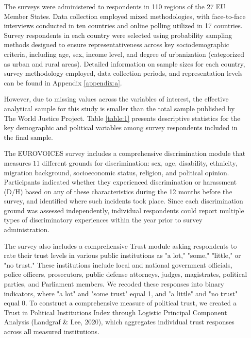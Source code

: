\documentclass{article}
\begin{document}
The surveys were administered to respondents in 110 regions of the 27 EU Member States. Data collection employed mixed methodologies, with face-to-face interviews conducted in ten countries and online polling utilized in 17 countries. Survey respondents in each country were selected using probability sampling methods designed to ensure representativeness across key sociodemographic criteria, including age, sex, income level, and degree of urbanization (categorized as urban and rural areas). Detailed information on sample sizes for each country, survey methodology employed, data collection periods, and representation levels can be found in Appendix \ref{appendix:a}.

However, due to missing values across the variables of interest, the effective analytical sample for this study is smaller than the total sample published by The World Justice Project. Table \ref{table:1} presents descriptive statistics for the key demographic and political variables among survey respondents included in the final sample.



The EUROVOICES survey includes a comprehensive discrimination module that measures 11 different grounds for discrimination: sex, age, disability, ethnicity, migration background, socioeconomic status, religion, and political opinion. Participants indicated whether they experienced discrimination or harassment (D/H) based on any of these characteristics during the 12 months before the survey, and identified where such incidents took place. Since each discrimination ground was assessed independently, individual respondents could report multiple types of discriminatory experiences within the year prior to survey administration.

The survey also includes a comprehensive Trust module asking respondents to rate their trust levels in various public institutions as "a lot," "some," "little," or "no trust." These institutions include local and national government officials, police officers, prosecutors, public defense attorneys, judges, magistrates, political parties, and Parliament members. We recoded these responses into binary indicators, where "a lot" and "some trust" equal 1, and "a little" and "no trust" equal 0. To construct a comprehensive measure of political trust, we created a Trust in Political Institutions Index through Logistic Principal Component Analysis (Landgraf \& Lee, 2020), which aggregates individual trust responses across all measured institutions.
\end{document}
